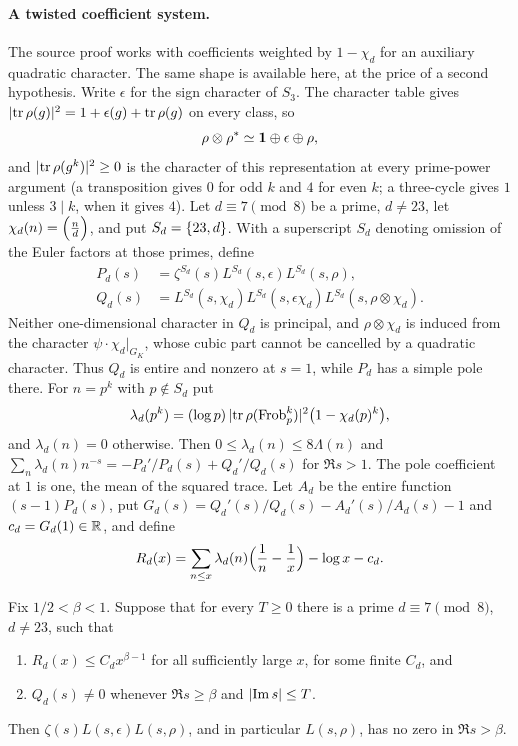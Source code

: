 \paragraph{A twisted coefficient system.}
The source proof works with coefficients weighted by $1-\chi_d$ for an auxiliary quadratic character.
The same shape is available here, at the price of a second hypothesis. Write $\epsilon$ for the sign
character of $S_3$. The character table gives $\lvert\operatorname{tr}\rho(g)\rvert^2=1+\epsilon(g)+\operatorname{tr}\rho(g)$ on every class,
so
\[
 \rho\otimes\rho^*\simeq\mathbf{1}\oplus\epsilon\oplus\rho ,
\]
and $\lvert\operatorname{tr}\rho(g^k)\rvert^2\ge0$ is the character of this representation at every prime-power argument
(a transposition gives $0$ for odd $k$ and $4$ for even $k$; a three-cycle gives $1$ unless $3\mid k$, when
it gives $4$). Let $d\equiv7\pmod8$ be a prime, $d\ne23$, let $\chi_d(n)=\Bigl(\frac{n}{d}\Bigr)$, and put
$S_d=\{23,d\}$. With a superscript $S_d$ denoting omission of the Euler factors at those primes, define
\begin{align*}
 P_d(s)&=\zeta^{S_d}(s)L^{S_d}(s,\epsilon)L^{S_d}(s,\rho),\\
 Q_d(s)&=L^{S_d}(s,\chi_d)L^{S_d}(s,\epsilon\chi_d)L^{S_d}(s,\rho\otimes\chi_d).
\end{align*}
Neither one-dimensional character in $Q_d$ is principal, and $\rho\otimes\chi_d$ is induced from the
character $\psi\cdot\chi_d|_{G_K}$, whose cubic part cannot be cancelled by a quadratic character. Thus
$Q_d$ is entire and nonzero at $s=1$, while $P_d$ has a simple pole there. For $n=p^k$ with $p\notin S_d$
put
\begin{equation}\label{hec:eq:lambdad}
 \lambda_d(p^k)=(\log p)\,\lvert\operatorname{tr}\rho(\operatorname{Frob}_p^k)\rvert^2\bigl(1-\chi_d(p)^k\bigr),
\end{equation}
and $\lambda_d(n)=0$ otherwise. Then $0\le\lambda_d(n)\le8\Lambda(n)$ and
$\sum_n\lambda_d(n)n^{-s}=-P_d'/P_d(s)+Q_d'/Q_d(s)$ for $\Re s>1$. The pole coefficient at $1$ is one,
the mean of the squared trace. Let $A_d$ be the entire function $(s-1)P_d(s)$, put
$G_d(s)=Q_d'(s)/Q_d(s)-A_d'(s)/A_d(s)-1$ and $c_d=G_d(1)\in\mathbb{R}$, and define
\begin{equation}\label{hec:eq:Rd}
 R_d(x)=\sum_{n\le x}\lambda_d(n)\Bigl(\frac1n-\frac1x\Bigr)-\log x-c_d.
\end{equation}

\begin{proposition}\label{hec:prop:twisted}
Fix $1/2<\beta<1$. Suppose that for every $T\ge0$ there is a prime $d\equiv7\pmod 8$, $d\ne23$, such that
\begin{enumerate}[label=\textup{(\Alph*)}]
\item $R_d(x)\le C_dx^{\beta-1}$ for all sufficiently large $x$, for some finite $C_d$, and
\item $Q_d(s)\ne0$ whenever $\Re s\ge\beta$ and $\lvert\operatorname{Im} s\rvert\le T$.
\end{enumerate}
Then $\zeta(s)L(s,\epsilon)L(s,\rho)$, and in particular $L(s,\rho)$, has no zero in $\Re s>\beta$.
\end{proposition}

